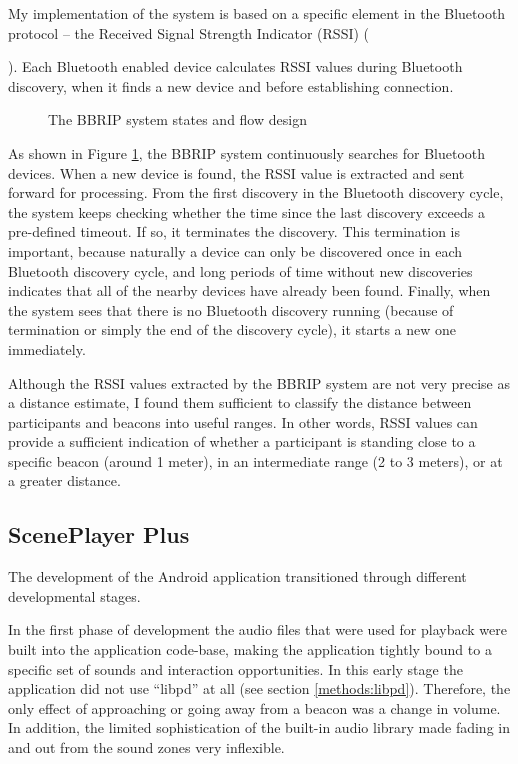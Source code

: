 \documentclass[a4paper,11pt]{article}
\begin{document}
My implementation of the system is based on a specific element in the Bluetooth protocol -- the Received Signal Strength Indicator (RSSI) ({\cite{bray12}).
Each Bluetooth enabled device calculates RSSI values during Bluetooth discovery, when it finds a new device and before establishing connection.

\begin{figure}[!htb]
	\centering
	\def\svgwidth{\columnwidth}
  	
	\caption{The BBRIP system states and flow design}\label{fig:bbrip}
\end{figure}

As shown in Figure \ref{fig:bbrip}, the BBRIP system continuously searches for Bluetooth devices.
When a new device is found, the RSSI value is extracted and sent forward for processing.
From the first discovery in the Bluetooth discovery cycle, the system keeps checking whether the time since the last discovery exceeds a pre-defined timeout.
If so, it terminates the discovery.
This termination is important, because naturally a device can only be discovered once in each Bluetooth discovery cycle, and long periods of time without new discoveries indicates that all of the nearby devices have already been found.
Finally, when the system sees that there is no Bluetooth discovery running (because of termination or simply the end of the discovery cycle), it starts a new one immediately.

Although the RSSI values extracted by the BBRIP system are not very precise as a distance estimate, I found them sufficient to classify the distance between participants and beacons into useful ranges.
In other words, RSSI values can provide a sufficient indication of whether a participant is standing close to a specific beacon (around 1 meter), in an intermediate range (2 to 3 meters), or at a greater distance.

\subsection{ScenePlayer Plus}\label{sceneplayer_plus}

The development of the Android application transitioned through different developmental stages.

In the first phase of development the audio files that were used for playback were built into the application code-base, making the application tightly bound to a specific set of sounds and interaction opportunities.
In this early stage the application did not use ``libpd'' at all (see section \ref{methods:libpd}).
Therefore, the only effect of approaching or going away from a beacon was a change in volume.
In addition, the limited sophistication of the built-in audio library made fading in and out from the sound zones very inflexible.

}
\end{document}
